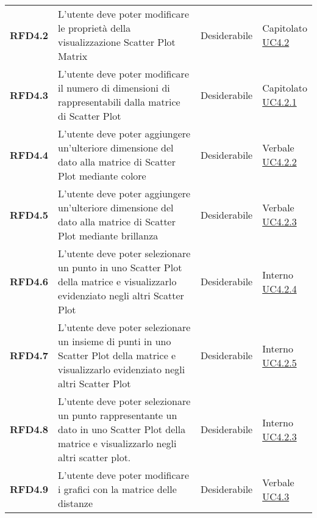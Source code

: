 \begin{longtable}[H]{>{\raggedright\bfseries}m{20mm} >{\raggedright}m{90mm} >{\raggedright}m{28mm} >{\raggedright\arraybackslash}m{30mm}}
    RFD4.2
    & L'utente deve poter modificare le proprietà della visualizzazione Scatter Plot Matrix
    & Desiderabile
    & \makecell{ Capitolato \\ \hyperref[ssub:uc4.2]{UC4.2} }\\

    RFD4.3
    & L'utente deve poter modificare il numero di dimensioni di rappresentabili dalla matrice di Scatter Plot
    & Desiderabile
    & \makecell{ Capitolato \\ \hyperref[par:uc4.2.1]{UC4.2.1} }\\

    RFD4.4
    & L'utente deve poter aggiungere un'ulteriore dimensione del dato alla matrice di Scatter Plot mediante colore
    & Desiderabile
    & \makecell{ Verbale \\ \hyperref[par:uc4.2.2]{UC4.2.2} }\\

    RFD4.5
    & L'utente deve poter aggiungere un'ulteriore dimensione del dato alla matrice di Scatter Plot mediante brillanza
    & Desiderabile
    & \makecell{ Verbale \\ \hyperref[par:uc4.2.3]{UC4.2.3} }\\

    RFD4.6
    & L'utente deve poter selezionare un punto in uno Scatter Plot della matrice e visualizzarlo evidenziato negli
    altri Scatter Plot
    & Desiderabile
    & \makecell{ Interno \\ \hyperref[par:uc4.2.4]{UC4.2.4} }\\

    RFD4.7
    & L'utente deve poter selezionare un insieme di punti in uno Scatter Plot della matrice e visualizzarlo evidenziato
    negli altri Scatter Plot
    & Desiderabile
    & \makecell{ Interno \\ \hyperref[par:uc4.2.5]{UC4.2.5} }\\

    RFD4.8
    & L'utente deve poter selezionare un punto rappresentante un dato in uno Scatter Plot della matrice e visualizzarlo
    negli altri scatter plot.
    & Desiderabile
    & \makecell{ Interno \\ \hyperref[par:uc4.2.3]{UC4.2.3} }\\

    RFD4.9
    & L'utente deve poter modificare i grafici con la matrice delle distanze
    & Desiderabile
    & \makecell{ Verbale \\ \hyperref[ssub:uc4.3]{UC4.3} }\\


\end{longtable}

